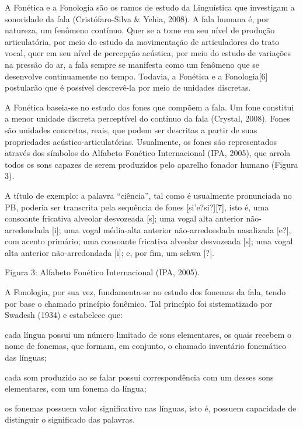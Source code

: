 A Fon\'etica e a Fonologia s\~ao os ramos de estudo da Lingu\'istica que
investigam a sonoridade da fala (Crist\'ofaro-Silva \& Yehia, 2008). A
fala humana \'e, por natureza, um fen\^omeno cont\'inuo. Quer se a tome em seu
n\'ivel de produ\c{c}\~ao articulat\'oria, por meio do estudo da movimenta\c{c}\~ao de
articuladores do trato vocal, quer em seu n\'ivel de percep\c{c}\~ao ac\'ustica,
por meio do estudo de varia\c{c}\~oes na press\~ao do ar, a fala sempre se
manifesta como um fen\^omeno que se desenvolve continuamente no tempo.
Todavia, a Fon\'etica e a Fonologia{[}6{]} postular\~ao que \'e poss\'ivel
descrev\^e-la por meio de unidades discretas.

A Fon\'etica baseia-se no estudo dos fones que comp\~oem a fala. Um fone
constitui a menor unidade discreta percept\'ivel do cont\'inuo da fala
(Crystal, 2008). Fones s\~ao unidades concretas, reais, que podem ser
descritas a partir de suas propriedades ac\'ustico-articulat\'orias.
Usualmente, os fones s\~ao representados atrav\'es dos s\'imbolos do Alfabeto
Fon\'etico Internacional (IPA, 2005), que arrola todos os sons capazes de
serem produzidos pelo aparelho fonador humano (Figura 3).

A t\'itulo de exemplo: a palavra ``ci\^encia'', tal como \'e usualmente
pronunciada no PB, poderia ser transcrita pela sequ\^encia de fones
{[}si'e?si?{]}{[}7{]}, isto \'e, uma consoante fricativa alveolar
desvozeada {[}s{]}; uma vogal alta anterior n\~ao-arredondada {[}i{]}; uma
vogal m\'edia-alta anterior n\~ao-arredondada nasalizada {[}e?{]}, com
acento prim\'ario; uma consoante fricativa alveolar desvozeada {[}s{]};
uma vogal alta anterior n\~ao-arredondada {[}i{]}; e, por fim, um schwa
{[}?{]}.


Figura 3: Alfabeto Fon\'etico Internacional (IPA, 2005).

A Fonologia, por sua vez, fundamenta-se no estudo dos fonemas da fala,
tendo por base o chamado princ\'ipio fon\^emico. Tal princ\'ipio foi
sistematizado por Swadesh (1934) e estabelece que:

cada l\'ingua possui um n\'umero limitado de sons elementares, os quais
recebem o nome de fonemas, que formam, em conjunto, o chamado invent\'ario
fonem\'atico das l\'inguas;

cada som produzido ao se falar possui correspond\^encia com um desses sons
elementares, com um fonema da l\'ingua;

os fonemas possuem valor significativo nas l\'inguas, isto \'e, possuem
capacidade de distinguir o significado das palavras.

